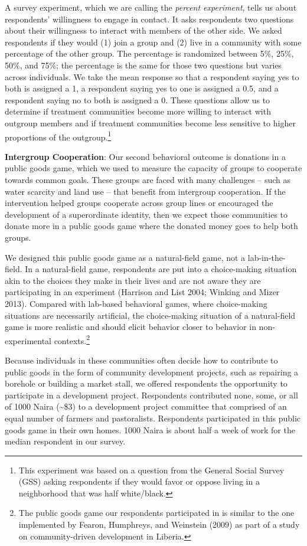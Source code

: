 \documentclass[11pt]{article}
\begin{document}
A survey experiment, which we are calling the \emph{percent experiment},
tells us about respondents' willingness to engage in contact. It asks
respondents two questions about their willingness to interact with
members of the other side. We asked respondents if they would (1) join a
group and (2) live in a community with some percentage of the other
group. The percentage is randomized between 5\%, 25\%, 50\%, and 75\%;
the percentage is the same for those two questions but varies across
individuals. We take the mean response so that a respondent saying yes
to both is assigned a 1, a respondent saying yes to one is assigned a
0.5, and a respondent saying no to both is assigned a 0. These questions
allow us to determine if treatment communities become more willing to
interact with outgroup members and if treatment communities become less
sensitive to higher proportions of the outgroup.\footnote{This
  experiment was based on a question from the General Social Survey
  (GSS) asking respondents if they would favor or oppose living in a
  neighborhood that was half white/black.}

\textbf{Intergroup Cooperation}: Our second behavioral outcome is
donations in a public goods game, which we used to measure the capacity
of groups to cooperate towards common goals. These groups are faced with
many challenges -- such as water scarcity and land use -- that benefit
from intergroup cooperation. If the intervention helped groups cooperate
across group lines or encouraged the development of a superordinate
identity, then we expect those communities to donate more in a public
goods game where the donated money goes to help both groups.

We designed this public goods game as a natural-field game, not a
lab-in-the-field. In a natural-field game, respondents are put into a
choice-making situation akin to the choices they make in their lives and
are not aware they are participating in an experiment (Harrison and List
2004; Winking and Mizer 2013). Compared with lab-based behavioral games,
where choice-making situations are necessarily artificial, the
choice-making situation of a natural-field game is more realistic and
should elicit behavior closer to behavior in non-experimental
contexts.\footnote{The public goods game our respondents participated in
  is similar to the one implemented by Fearon, Humphreys, and Weinstein
  (2009) as part of a study on community-driven development in Liberia.}

Because individuals in these communities often decide how to contribute
to public goods in the form of community development projects, such as
repairing a borehole or building a market stall, we offered respondents
the opportunity to participate in a development project. Respondents
contributed none, some, or all of 1000 Naira (\textasciitilde\$3) to a
development project committee that comprised of an equal number of
farmers and pastoralists. Respondents participated in this public goods
game in their own homes. 1000 Naira is about half a week of work for the
median respondent in our survey.
\end{document}
